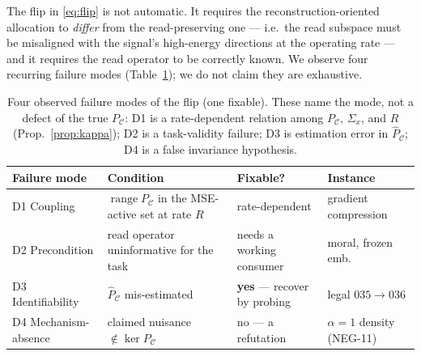 \documentclass[10pt]{article} %
\theoremstyle{remark}
\newcommand{\PC}{P_{\mathcal{C}}}
\newcommand{\Sx}{\Sigma_{x}}
\begin{document}
The flip in \eqref{eq:flip} is not automatic. It requires the reconstruction-oriented
allocation to \emph{differ} from the read-preserving one --- i.e.\ the read subspace must
be misaligned with the signal's high-energy directions at the operating rate --- and it
requires the read operator to be correctly known. We observe four recurring failure modes
(Table~\ref{tab:degeneracies}); we do not claim they are exhaustive.

\begin{table}[h]\footnotesize\centering
\caption{Four observed failure modes of the flip (one fixable). These name the mode, not a
defect of the true $\PC$: D1 is a rate-dependent relation among $\PC$, $\Sx$, and $R$
(Prop.~\ref{prop:kappa}); D2 is a task-validity failure; D3 is estimation error in
$\hat\PC$; D4 is a false invariance hypothesis.}
\label{tab:degeneracies}
\begin{tabular}{@{}llll@{}}
\toprule
Failure mode & Condition & Fixable? & Instance \\
\midrule
D1 Coupling & $\operatorname{range}\PC$ in the MSE-active set at rate $R$ & rate-dependent & gradient compression \\
D2 Precondition & read operator uninformative for the task & needs a working consumer & moral, frozen emb. \\
D3 Identifiability & $\hat\PC$ mis-estimated & \textbf{yes} --- recover by probing & legal $035{\to}036$ \\
D4 Mechanism-absence & claimed nuisance $\notin\ker\PC$ & no --- a refutation & $\alpha{=}1$ density (NEG-11) \\
\bottomrule
\end{tabular}
\end{table}
\end{document}
